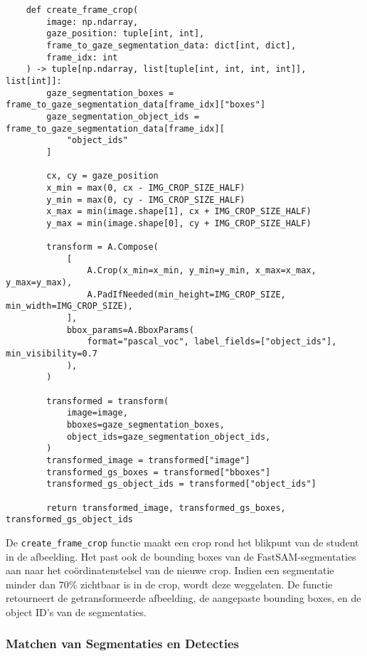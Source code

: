 \begin{listing}[H]
  \fontsize{12pt}{10pt}
  \begin{verbatim}
    def create_frame_crop(
        image: np.ndarray,
        gaze_position: tuple[int, int],
        frame_to_gaze_segmentation_data: dict[int, dict],
        frame_idx: int
    ) -> tuple[np.ndarray, list[tuple[int, int, int, int]], list[int]]:
        gaze_segmentation_boxes = frame_to_gaze_segmentation_data[frame_idx]["boxes"]
        gaze_segmentation_object_ids = frame_to_gaze_segmentation_data[frame_idx][
            "object_ids"
        ]

        cx, cy = gaze_position
        x_min = max(0, cx - IMG_CROP_SIZE_HALF)
        y_min = max(0, cy - IMG_CROP_SIZE_HALF)
        x_max = min(image.shape[1], cx + IMG_CROP_SIZE_HALF)
        y_max = min(image.shape[0], cy + IMG_CROP_SIZE_HALF)

        transform = A.Compose(
            [
                A.Crop(x_min=x_min, y_min=y_min, x_max=x_max, y_max=y_max),
                A.PadIfNeeded(min_height=IMG_CROP_SIZE, min_width=IMG_CROP_SIZE),
            ],
            bbox_params=A.BboxParams(
                format="pascal_voc", label_fields=["object_ids"], min_visibility=0.7
            ),
        )

        transformed = transform(
            image=image,
            bboxes=gaze_segmentation_boxes,
            object_ids=gaze_segmentation_object_ids,
        )
        transformed_image = transformed["image"]
        transformed_gs_boxes = transformed["bboxes"]
        transformed_gs_object_ids = transformed["object_ids"]

        return transformed_image, transformed_gs_boxes, transformed_gs_object_ids
  \end{verbatim}
  \caption[Functie voor het creëren van een crop rond het blikpunt van de student]{
    \label{listing:create-frame-crop}
    De \texttt{create\_frame\_crop} functie maakt een crop rond het blikpunt van de student in de afbeelding.
    Het past ook de bounding boxes van de FastSAM-segmentaties aan naar het coördinatenstelsel van de nieuwe crop.
    Indien een segmentatie minder dan 70\% zichtbaar is in de crop, wordt deze weggelaten.
    De functie retourneert de getransformeerde afbeelding, de aangepaste bounding boxes, en de object ID's van de segmentaties.
    }
\end{listing}

\subsubsection{Matchen van Segmentaties en Detecties}


